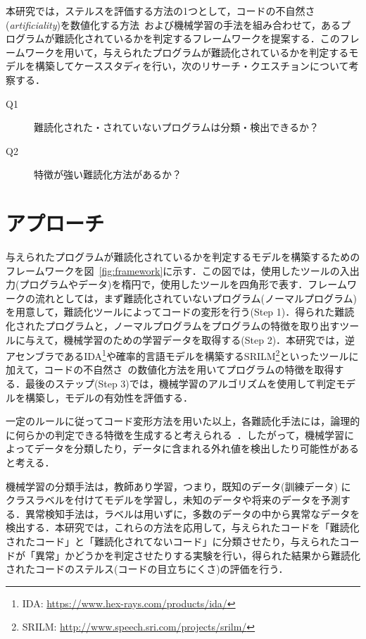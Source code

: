 \documentclass[12pt]{jarticle}
\begin{document}
本研究では，ステルスを評価する方法の1つとして，コードの不自然さ(\textit{artificiality})を数値化する方法~\cite{code-art}および機械学習の手法を組み合わせて，あるプログラムが難読化されているかを判定するフレームワークを提案する．このフレームワークを用いて，与えられたプログラムが難読化されているかを判定するモデルを構築してケーススタディを行い，次のリサーチ・クエスチョンについて考察する．

\begin{description}
  \item[Q1]難読化された・されていないプログラムは分類・検出できるか？
  \item[Q2]特徴が強い難読化方法があるか？
\end{description}


\newpage

\section{アプローチ} \label{sec:approach}
与えられたプログラムが難読化されているかを判定するモデルを構築するためのフレームワークを図~\ref{fig:framework}に示す．この図では，使用したツールの入出力(プログラムやデータ)を楕円で，使用したツールを四角形で表す．フレームワークの流れとしては，まず難読化されていないプログラム(ノーマルプログラム)を用意して，難読化ツールによってコードの変形を行う(Step 1)．得られた難読化されたプログラムと，ノーマルプログラムをプログラムの特徴を取り出すツールに与えて，機械学習のための学習データを取得する(Step 2)．本研究では，逆アセンブラであるIDA\footnote{IDA: \url{https://www.hex-rays.com/products/ida/}}や確率的言語モデルを構築するSRILM\footnote{SRILM: \url{http://www.speech.sri.com/projects/srilm/}}といったツールに加えて，コードの不自然さ~\cite{code-art}の数値化方法を用いてプログラムの特徴を取得する．最後のステップ(Step 3)では，機械学習のアルゴリズムを使用して判定モデルを構築し，モデルの有効性を評価する．

一定のルールに従ってコード変形方法を用いた以上，各難読化手法には，論理的に何らかの判定できる特徴を生成すると考えられる~\cite{pinpoint}．したがって，機械学習によってデータを分類したり，データに含まれる外れ値を検出したり可能性があると考える．

機械学習の分類手法は，教師あり学習，つまり，既知のデータ(訓練データ) にクラスラベルを付けてモデルを学習し，未知のデータや将来のデータを予測する．異常検知手法は，ラベルは用いずに，多数のデータの中から異常なデータを検出する．本研究では，これらの方法を応用して，与えられたコードを「難読化されたコード」と「難読化されてないコード」に分類させたり，与えられたコードが「異常」かどうかを判定させたりする実験を行い，得られた結果から難読化されたコードのステルス(コードの目立ちにくさ)の評価を行う．
\end{document}
